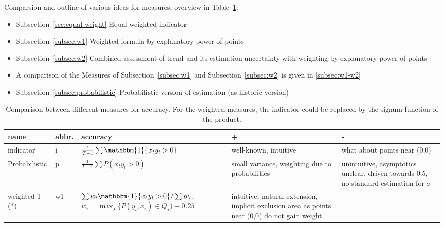 \documentclass[oneside]{article}
\theoremstyle{plain}%
\theoremstyle{definition}
\newcommand{\ind}[1]{\mathbbm{1}\{#1\}}
\newcommand{\ydiff}{D y}
\newcommand{\xdiff}{Dx}
\begin{document}
Comparsion and outline of various ideas for measures; overview in Table~\ref{tab:comparison-measures}:
\begin{itemize}
    \item Subsection~\ref{sec:equal-weight} Equal-weighted indicator
    \item Subsection~\ref{subsec:w1} Weighted formula by explanatory power of points
    \item Subsection~\ref{subsec:w2} Combined assessment of trend and its estimation uncertainty with weighting by explanatory power of points
    \item A comparison of the Measures of Subsection~\ref{subsec:w1} and Subsection~\ref{subsec:w2} is given in \ref{subsec:w1-w2}
    \item Subsection~\ref{subsec:probabilistic} Probabilistic version of estimation (as historic version)
\end{itemize}


\begin{table}[]
    \centering
    \begin{tabular}{l l p{4cm} p{4cm} p{4cm}}
    \toprule
    name & abbr. & accuracy & + & - \\ \midrule
    indicator & i & $\frac{1}{T-1} \sum \ind{x_t y_t > 0}$ &  well-known, intuitive & what about points near (0,0) \\
    Probabilistic & p & $\frac{1}{T-1} \sum P{(x_t y_t > 0)}$ & small variance, weighting due to probabilities & unintuitive, asymptotics unclear, driven towards 0.5, no standard estimation for $\sigma$  \\
    weighted 1 (*) & w1 & {\small {$\sum w_i \ind{x_t y_t > 0} / \sum w_i$,\newline $w_i = \max_j\{P(y_i, x_i) \in Q_j \} - 0.25$}} & intuitive, natural extension, implicit exclusion area as points near (0,0) do not gain weight & \\ \bottomrule
    \end{tabular}
    \caption{Comparison between different measures for accuracy. For the weighted measures, the indicator could be replaced by the signum function of the product.}
    \label{tab:comparison-measures}
\end{table}
\end{document}
